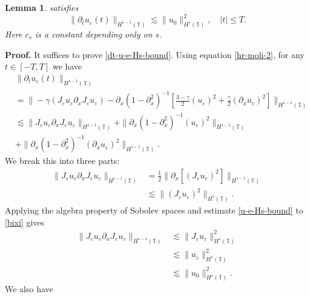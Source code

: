 \documentclass[12pt,reqno]{amsart}
\newcommand{\p}{\partial}
\newcommand{\ci}{\mathbb{T}}
\newcommand{\ee}{\varepsilon}
\theoremstyle{plain}  %
\newtheorem{lemma}{Lemma}
\theoremstyle{definition}
\begin{document}
\begin{appendices}
\begin{lemma}
		satisfies
		\begin{equation}
			\label{dt-u-e-Hs-bound}
			\|\p_t u_\ee(t)\|_{H^{s-1}(\ci)}
			\lesssim
			\|u_0 \|_{H^s(\ci)}^2,
			\quad
			|t| \le T.
		\end{equation}
		Here  $c_s$ is a constant depending only on $s$.
	\end{lemma}
	{\bf Proof.}  It suffices to prove  \eqref{dt-u-e-Hs-bound}.
	Using equation \eqref{hr-moli-2}, for any $t\in [-T, T]$ we have
	\begin{equation*}
		\begin{split}
			& \| \partial_t u_\varepsilon(t) \|_{H^{s-1}(\ci)}  
			\\
			& = 
			\| -\gamma (J_\ee u_\ee \partial_x  J_\ee  u_\ee) -
			\p_x (1-\p_x^2)^{-1} \left [\frac{3-\gamma}{2} (u_\ee)^2 +
			\frac{\gamma}{2}(\p_x u_\ee)^2 \right ] \|_{H^{s-1}(\ci)}
			\\
			& \lesssim  
			\| J_\ee u_\ee \partial_x  J_\ee  u_\ee \|_{H^{s-1}(\ci)}
			+ \|\p_x (1-\p_x^2)^{-1} (u_\ee)^2 \|_{H^{s-1}(\ci)}
			\\
			& + \| \p_x (1-\p_x^2)^{-1}(\p_x u_\ee)^2\|_{H^{s-1}(\ci)}.
			\end{split}
		\end{equation*}
		We break this into three parts:
		\begin{equation}
			\label{bixi}
			\begin{split}
				\| J_\ee u_\ee \p_x J_\ee u_\ee \|_{H^{s-1}(\ci)}
				& = 
				\frac{1}{2}\|\p_x[(J_\varepsilon u_\varepsilon
				)^2]\|_{H^{s-1}(\ci)}
				\\
				& \lesssim \|(J_\varepsilon u_\varepsilon )^2\|_{H^s(\ci)}.
			\end{split}
		\end{equation}
		Applying the algebra property of Sobolev spaces and estimate
		\eqref{u-e-Hs-bound} to \eqref{bixi} gives 
		\begin{equation}
			\label{deriv1}
			\begin{split}
				\|J_\ee u_\ee \p_x J_\ee u_\ee  
				\|_{H^{s-1}(\ci)}
				& \lesssim
				\|J_\varepsilon u_\varepsilon \|_{H^s(\ci)}^2
				\\
				&\lesssim
				\| u_\varepsilon \|_{H^s(\ci)}^2
				\\
				&\lesssim
				\|u_0\|_{H^s(\ci)}^2.
			\end{split}
		\end{equation}
		We also have
		\begin{equation*}
			\begin{split}

\end{split}
\end{equation*}
\end{appendices}
\end{document}

